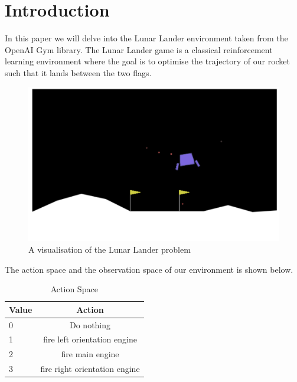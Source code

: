 \documentclass{article}
\begin{document}

\begin{abstract}

\end{abstract}

\section {Introduction}
In this paper we will delve into the Lunar Lander environment taken from the OpenAI Gym library. The Lunar Lander game is a classical reinforcement learning environment where the goal is to optimise the trajectory of our rocket such that it lands between the two flags. 

\begin{figure}[htbp]
\centering
\includegraphics[width=0.6\linewidth]{Report/images/visualisation.png}
\caption{\label{fig:Visualization of the Cart-pole} A visualisation of the Lunar Lander problem}
\end{figure}



The action space and the observation space of our environment is shown below. 


\begin{table}[htbp]
\centering
\begin{tabular}{|l|c|}
\hline
\textbf{Value} & \textbf{Action} \\
\hline
0  & Do nothing \\
\hline
1 & fire left orientation engine \\
\hline
2  & fire main engine \\
\hline
3 & fire right orientation engine  \\
\hline
\end{tabular}
\caption{Action Space}
\label{tab:hyper-parameters}
\end{table}
\end{document}
